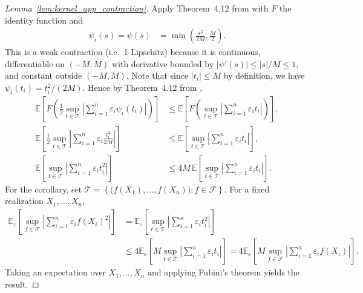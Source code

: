 \documentclass[11pt,lof]{puthesis}
\newcommand{\E}{\ensuremath{\mathbb{E}}}
\newcommand{\cF}{\ensuremath{\mathcal{F}}}
\newcommand{\cT}{\ensuremath{\mathcal{T}}}
\theoremstyle{break}
\theoremstyle{proof}
\newtheorem{proof}{Proof}
\begin{document}
\begin{proof}[Lemma~\ref{lem:kernel_app_contraction}]

Apply Theorem~4.12 from \citet{ledoux1991probability} with $F$ the identity
function and
%
\begin{align*}
\psi_i(s)
= \psi(s)
&=
\min
\left(
\frac{s^2}{2M},
\frac{M}{2}
\right).
\end{align*}
%
This is a weak contraction
(i.e.\ 1-Lipschitz)
because it is continuous,
differentiable on $(-M,M)$
with derivative bounded by
$|\psi'(s)| \leq |s|/M \leq 1$,
and constant outside $(-M,M)$.
Note that since $|t_i| \leq M$
by definition,
we have $\psi_i(t_i) = t_i^2 / (2M)$.
Hence
by Theorem~4.12
from \citet{ledoux1991probability},
%
\begin{align*}
\E
\left[
F
\left(
\frac{1}{2}
\sup_{t \in \cT}
\left|
\sum_{i=1}^n
\varepsilon_i
\psi_i(t_i)
\right|
\right)
\right]
&\leq
\E
\left[
F
\left(
\sup_{t \in \cT}
\left|
\sum_{i=1}^n
\varepsilon_i
t_i
\right|
\right)
\right], \\
\E
\left[
\frac{1}{2}
\sup_{t \in \cT}
\left|
\sum_{i=1}^n
\varepsilon_i
\frac{t_i^2}{2M}
\right|
\right]
&\leq
\E
\left[
\sup_{t \in \cT}
\left|
\sum_{i=1}^n
\varepsilon_i
t_i
\right|
\right], \\
\E
\left[
\sup_{t \in \cT}
\left|
\sum_{i=1}^n
\varepsilon_i
t_i^2
\right|
\right]
&\leq
4M \,
\E
\left[
\sup_{t \in \cT}
\left|
\sum_{i=1}^n
\varepsilon_i
t_i
\right|
\right].
\end{align*}
%
For the corollary, set
$\cT = \left\{\big(f(X_1), \ldots, f(X_n)\big) : f \in \cF\right\}$.
For a fixed realization
$X_1, \ldots, X_n$,
%
\begin{align*}
\E_\varepsilon
\left[
\sup_{f \in \cF}
\left|
\sum_{i=1}^n
\varepsilon_i
f(X_i)^2
\right|
\right]
&=
\E_\varepsilon
\left[
\sup_{t \in \cT}
\left|
\sum_{i=1}^n
\varepsilon_i
t_i^2
\right|
\right] \\
&\leq 4
\E_\varepsilon
\left[
M
\sup_{t \in \cT}
\left|
\sum_{i=1}^n
\varepsilon_i
t_i
\right|
\right]
= 4 \E_\varepsilon
\left[
M
\sup_{f \in \cF}
\left|
\sum_{i=1}^n
\varepsilon_i
f(X_i)
\right|
\right].
\end{align*}
%
Taking an expectation over $X_1, \ldots, X_n$
and applying Fubini's theorem yields the result.
\end{proof}
\end{document}
